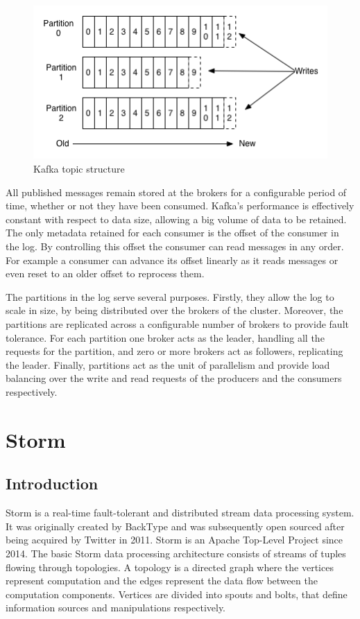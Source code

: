 \begin{figure}[H]
\centering
\includegraphics{figures/kafka_topic}
\caption{Kafka topic structure}
\label{figure:kafka_topic}
\end{figure}

All published messages remain stored at the brokers for a configurable period of time, whether or not they have been consumed. Kafka's performance is effectively constant with respect to data size, allowing a big volume of data to be retained. The only metadata retained for each consumer is the offset of the consumer in the log. By controlling this offset the consumer can read messages in any order. For example a consumer can advance its offset linearly as it reads messages or even reset to an older offset to reprocess them.

The partitions in the log serve several purposes. Firstly, they allow the log to scale in size, by being distributed over the brokers of the cluster. Moreover, the partitions are replicated across a configurable number of brokers to provide fault tolerance. For each partition one broker acts as the leader,  handling all the requests for the partition, and zero or more brokers act as followers, replicating the leader. Finally, partitions act as the unit of parallelism and provide load balancing over the write and read requests of the producers and the consumers respectively.


\section{Storm}

\subsection{Introduction}

Storm is a real-time fault-tolerant and distributed stream data processing system. It was originally created by BackType and was subsequently open sourced after being acquired by Twitter in 2011. Storm is an Apache Top-Level Project since 2014. The basic Storm data processing architecture consists of streams of tuples flowing through topologies. A topology is a directed graph where the vertices represent computation and the edges represent the data flow between the computation components. Vertices are divided into spouts and bolts, that define information sources and manipulations respectively.

